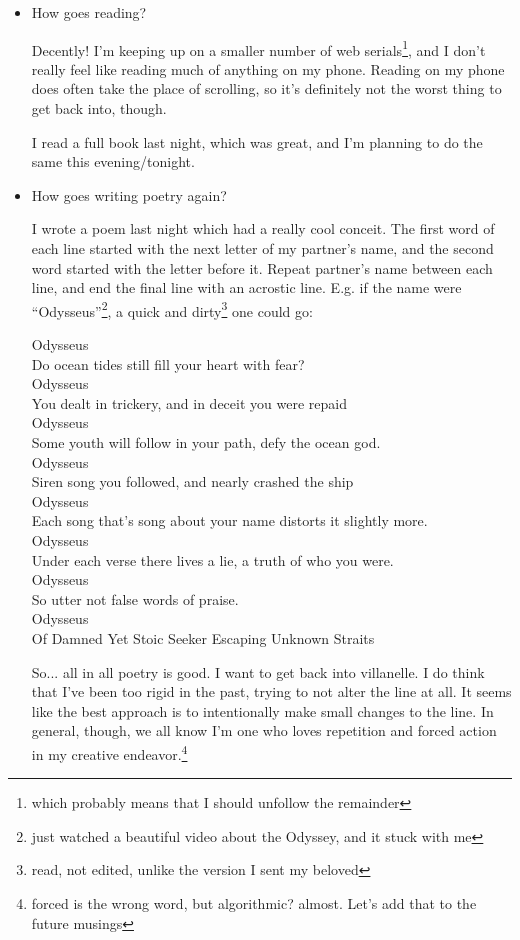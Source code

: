 \documentclass[12pt]{article}
\newcommand{\say}[1]{``#1''}
\renewcommand{\,}{\textsuperscript{,}}
\begin{document}
\begin{itemize}
\begin{itemize}
\begin{itemize}
\item How goes reading?

Decently! I'm keeping up on a smaller number of web serials\footnote{which probably means that I should unfollow the remainder}, and I don't really feel like reading much of anything on my phone.  
Reading on my phone does often take the place of scrolling, so it's definitely not the worst thing to get back into, though.

I read a full book last night, which was great, and I'm planning to do the same this evening/tonight.

\item How goes writing poetry again?

I wrote a poem last night which had a really cool conceit.  
The first word of each line started with the next letter of my partner's name, and the second word started with the letter before it.  
Repeat partner's name between each line, and end the final line with an acrostic line.  
E.g. if the name were \say{Odysseus}\footnote{just watched a beautiful video about the Odyssey, and it stuck with me}, a quick and dirty\footnote{read, not edited, unlike the version I sent my beloved} one could go:

Odysseus\\  
Do ocean tides still fill your heart with fear?\\  
Odysseus \\  
You dealt in trickery, and in deceit you were repaid\\  
Odysseus\\  
Some youth will follow in your path, defy the ocean god.\\  
Odysseus\\  
Siren song you followed, and nearly crashed the ship\\  
Odysseus\\  
Each song that's song about your name distorts it slightly more.  \\
Odysseus\\  
Under each verse there lives a lie, a truth of who you were.  \\
Odysseus\\  
So utter not false words of praise.  \\
Odysseus\\  
Of Damned Yet Stoic Seeker Escaping Unknown Straits

So... all in all poetry is good. I want to get back into villanelle. I do think that I've been too rigid in the past, trying to not alter the line at all.  
It seems like the best approach is to intentionally make small changes to the line.  
In general, though, we all know I'm one who loves repetition and forced action in my creative endeavor.\footnote{forced is the wrong word, but algorithmic? almost. Let's add that to the future musings}


\end{itemize}
\end{itemize}
\end{itemize}
\end{document}
